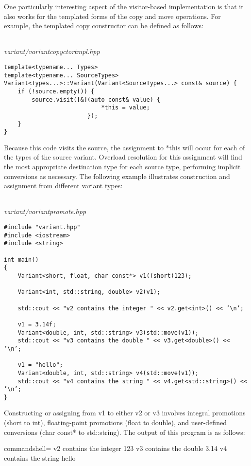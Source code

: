 One particularly interesting aspect of the visitor-based implementation is that it also works for the templated forms of the copy and move operations. For example, the templated copy constructor can be defined as follows:

\hspace*{\fill} \\ %
\noindent
\textit{variant/variantcopyctortmpl.hpp}
\begin{lstlisting}[style=styleCXX]
template<typename... Types>
template<typename... SourceTypes>
Variant<Types...>::Variant(Variant<SourceTypes...> const& source) {
	if (!source.empty()) {
		source.visit([&](auto const& value) {
							*this = value;
						});
	}
}
\end{lstlisting}

Because this code visits the source, the assignment to *this will occur for each of the types of the source variant. Overload resolution for this assignment will find the most appropriate destination type for each source type, performing implicit conversions as necessary. The following example illustrates construction and assignment from different variant types:

\hspace*{\fill} \\ %
\noindent
\textit{variant/variantpromote.hpp}
\begin{lstlisting}[style=styleCXX]
#include "variant.hpp"
#include <iostream>
#include <string>

int main()
{
	Variant<short, float, char const*> v1((short)123);
	
	Variant<int, std::string, double> v2(v1);
	
	std::cout << "v2 contains the integer " << v2.get<int>() << ’\n’;
	
	v1 = 3.14f;
	Variant<double, int, std::string> v3(std::move(v1));
	std::cout << "v3 contains the double " << v3.get<double>() << ’\n’;
	
	v1 = "hello";
	Variant<double, int, std::string> v4(std::move(v1));
	std::cout << "v4 contains the string " << v4.get<std::string>() << ’\n’;
}
\end{lstlisting}

Constructing or assigning from v1 to either v2 or v3 involves integral promotions (short to int), floating-point promotions (float to double), and user-defined conversions (char const* to std::string). The output of this program is as follows:

\begin{tcblisting}{commandshell={}}
v2 contains the integer 123
v3 contains the double 3.14
v4 contains the string hello
\end{tcblisting}

